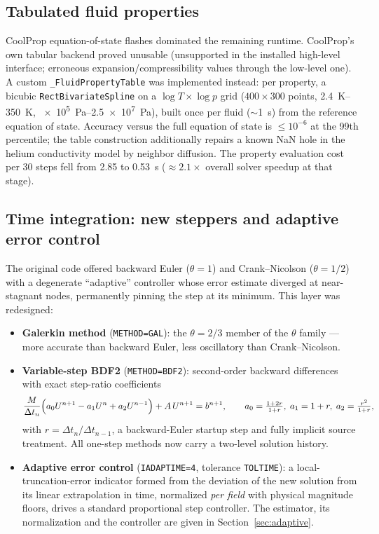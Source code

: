 \documentclass[11pt,a4paper]{article}
\newcommand{\code}[1]{\texttt{#1}}
\begin{document}
\subsection{Tabulated fluid properties}

CoolProp equation-of-state flashes dominated the remaining runtime. CoolProp's own
tabular backend proved unusable (unsupported in the installed high-level interface;
erroneous expansion/compressibility values through the low-level one). A custom
\code{\_FluidPropertyTable} was implemented instead: per property, a bicubic
\code{RectBivariateSpline} on a $\log T \times \log p$ grid
($400 \times 300$ points, \SIrange{2.4}{350}{K}, \SIrange{e5}{2.5e7}{Pa}), built once
per fluid ($\sim$\SI{1}{s}) from the reference equation of state. Accuracy versus the
full equation of state is $\le 10^{-6}$ at the 99th percentile; the table construction
additionally repairs a known NaN hole in the helium conductivity model by neighbor
diffusion. The property evaluation cost per 30 steps fell from 2.85 to \SI{0.53}{s}
($\approx 2.1\times$ overall solver speedup at that stage).

\subsection{Time integration: new steppers and adaptive error control}
\label{sec:timestepping}

The original code offered backward Euler ($\theta=1$) and Crank--Nicolson
($\theta=1/2$) with a degenerate ``adaptive'' controller whose error estimate diverged
at near-stagnant nodes, permanently pinning the step at its minimum. This layer was
redesigned:

\begin{itemize}
  \item \textbf{Galerkin method} (\code{METHOD=GAL}): the $\theta=2/3$ member of the
        $\theta$ family --- more accurate than backward Euler, less oscillatory than
        Crank--Nicolson.
  \item \textbf{Variable-step BDF2} (\code{METHOD=BDF2}): second-order backward
        differences with exact step-ratio coefficients
        \begin{equation*}
          \frac{M}{\Delta t_n}\Bigl(a_0 U^{n+1} - a_1 U^{n} + a_2 U^{n-1}\Bigr)
            + A\,U^{n+1} = b^{n+1},\qquad
          a_0 = \tfrac{1+2r}{1+r},\;
          a_1 = 1+r,\;
          a_2 = \tfrac{r^2}{1+r},
        \end{equation*}
        with $r = \Delta t_n / \Delta t_{n-1}$, a backward-Euler startup step and
        fully implicit source treatment. All one-step methods now carry a two-level
        solution history.
  \item \textbf{Adaptive error control} (\code{IADAPTIME=4}, tolerance
        \code{TOLTIME}): a local-truncation-error indicator formed from the deviation
        of the new solution from its linear extrapolation in time, normalized
        \emph{per field} with physical magnitude floors, drives a standard
        proportional step controller. The estimator, its normalization and the
        controller are given in Section~\ref{sec:adaptive}.
\end{itemize}
\end{document}
